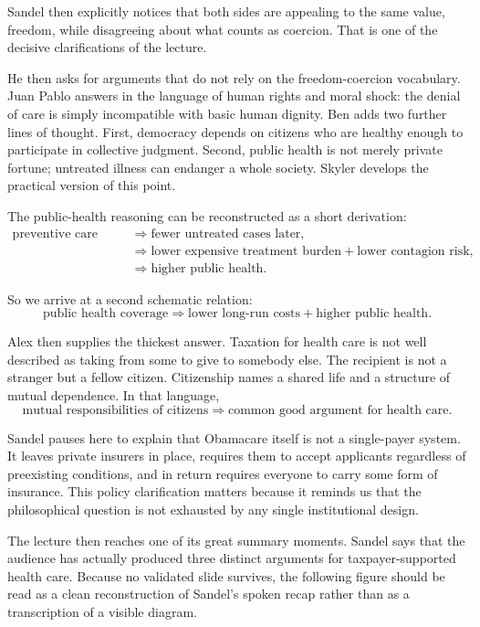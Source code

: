 Sandel then explicitly notices that both sides are appealing to the same value, freedom, while disagreeing about what counts as coercion. That is one of the decisive clarifications of the lecture.

He then asks for arguments that do not rely on the freedom-coercion vocabulary. Juan Pablo answers in the language of human rights and moral shock: the denial of care is simply incompatible with basic human dignity. Ben adds two further lines of thought. First, democracy depends on citizens who are healthy enough to participate in collective judgment. Second, public health is not merely private fortune; untreated illness can endanger a whole society. Skyler develops the practical version of this point.

The public-health reasoning can be reconstructed as a short derivation:
\begin{align}
\text{preventive care now}
&\Longrightarrow
\text{fewer untreated cases later}, \\
&\Longrightarrow
\text{lower expensive treatment burden} + \text{lower contagion risk}, \\
&\Longrightarrow
\text{higher public health}.
\end{align}

So we arrive at a second schematic relation:
\begin{equation}
\text{public health coverage}
\Longrightarrow
\text{lower long-run costs} + \text{higher public health}.
\end{equation}

Alex then supplies the thickest answer. Taxation for health care is not well described as taking from some to give to somebody else. The recipient is not a stranger but a fellow citizen. Citizenship names a shared life and a structure of mutual dependence. In that language,
\begin{equation}
\text{mutual responsibilities of citizens}
\Longrightarrow
\text{common good argument for health care}.
\end{equation}

Sandel pauses here to explain that Obamacare itself is not a single-payer system. It leaves private insurers in place, requires them to accept applicants regardless of preexisting conditions, and in return requires everyone to carry some form of insurance. This policy clarification matters because it reminds us that the philosophical question is not exhausted by any single institutional design.

The lecture then reaches one of its great summary moments. Sandel says that the audience has actually produced three distinct arguments for taxpayer-supported health care. Because no validated slide survives, the following figure should be read as a clean reconstruction of Sandel's spoken recap rather than as a transcription of a visible diagram.

